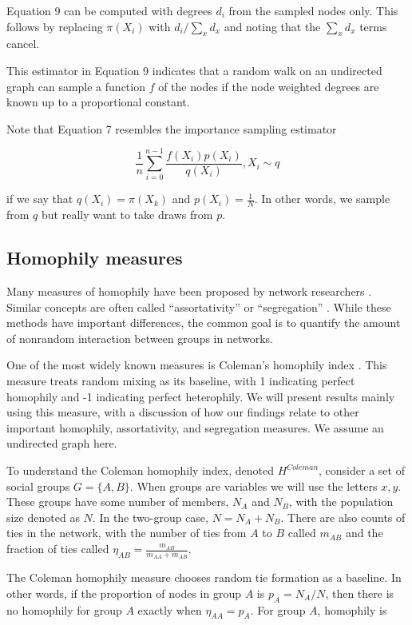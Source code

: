 \documentclass[a4paper]{article}
\begin{document}
Equation 9 can be computed with degrees $d_i$ from the sampled nodes only. This follows by replacing $\pi(X_i)$ with $d_i / \sum_x d_x$ and noting that the $\sum_x d_x$ terms cancel.

This estimator in Equation 9 indicates that a random walk on an undirected graph can sample a function $f$ of the nodes if the node weighted degrees are known up to a proportional constant.

Note that Equation 7 resembles the importance sampling estimator

\begin{equation}
\frac{1}{n} \sum_{i=0}^{n-1} \frac{f(X_i) p(X_i)}{q(X_i)}, X_i \sim q
\end{equation}

\noindent
if we say that $q(X_i) = \pi(X_k)$ and $p(X_i) = \frac{1}{N}$. In other words, we sample from $q$ but really want to take draws from $p$.

\subsection{Homophily measures}

Many measures of homophily have been proposed by network researchers \cite{bojanowski_measuring_2014}. Similar concepts are often called ``assortativity'' \cite{} or ``segregation'' \cite{}. While these methods have important differences, the common goal is to quantify the amount of nonrandom interaction between groups in networks.

One of the most widely known measures is Coleman's homophily index \cite{coleman_relational_1958}. This measure treats random mixing as its baseline, with 1 indicating perfect homophily and -1 indicating perfect heterophily. We will present results mainly using this measure, with a discussion of how our findings relate to other important homophily, assortativity, and segregation measures. We assume an undirected graph here.

To understand the Coleman homophily index, denoted $H^{Coleman}$, consider a set of social groups $G = \{A, B\}$. When groups are variables we will use the letters $x, y$. These groups have some number of members, $N_A$ and $N_B$, with the population size denoted as $N$. In the two-group case, $N = N_A + N_B$. There are also counts of ties in the network, with the number of ties from $A$ to $B$ called $m_{AB}$ and the fraction of ties called $\eta_{AB} = \frac{m_{AB}}{m_{AA} + m_{AB}}$.

The Coleman homophily measure chooses random tie formation as a baseline. In other words, if the proportion of nodes in group $A$ is $p_A = N_A / N$, then there is no homophily for group $A$ exactly when $\eta_{AA} = p_A$. For group $A$, homophily is
\end{document}
